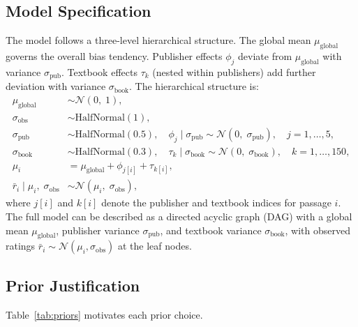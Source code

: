 \documentclass[10pt,letterpaper]{article}
\begin{document}
\subsection{Model Specification}

The model follows a three-level hierarchical structure.  The global mean
$\mu_{\text{global}}$ governs the overall bias tendency.  Publisher effects
$\phi_j$ deviate from $\mu_{\text{global}}$ with variance $\sigma_{\text{pub}}$.
Textbook effects $\tau_k$ (nested within publishers) add further deviation with
variance $\sigma_{\text{book}}$.  The hierarchical structure is:
\begin{align}
  \mu_{\text{global}} &\sim \mathcal{N}(0,\; 1),
  \label{eq:prior_muglobal}\\[4pt]
  \sigma_{\text{obs}} &\sim \text{HalfNormal}(1),
  \label{eq:prior_sigobs}\\[4pt]
  \sigma_{\text{pub}} &\sim \text{HalfNormal}(0.5),\quad
  \phi_j \mid \sigma_{\text{pub}} \sim \mathcal{N}(0,\; \sigma_{\text{pub}}),
  \quad j = 1,\ldots,5,
  \label{eq:prior_publisher}\\[4pt]
  \sigma_{\text{book}} &\sim \text{HalfNormal}(0.3),\quad
  \tau_k \mid \sigma_{\text{book}} \sim \mathcal{N}(0,\; \sigma_{\text{book}}),
  \quad k = 1,\ldots,150,
  \label{eq:prior_textbook}\\[4pt]
  \mu_i &= \mu_{\text{global}} + \phi_{j[i]} + \tau_{k[i]},
  \label{eq:linear_predictor}\\[4pt]
  \bar{r}_i \mid \mu_i,\; \sigma_{\text{obs}} &\sim \mathcal{N}(\mu_i,\;
    \sigma_{\text{obs}}),
  \label{eq:likelihood}
\end{align}
where $j[i]$ and $k[i]$ denote the publisher and textbook indices for passage
$i$.  The full model can be described as a directed acyclic graph (DAG) with
a global mean $\mu_{\text{global}}$, publisher variance $\sigma_{\text{pub}}$,
and textbook variance $\sigma_{\text{book}}$, with observed ratings
$\bar{r}_i \sim \mathcal{N}(\mu_i, \sigma_{\text{obs}})$ at the leaf nodes.

\subsection{Prior Justification}

Table~\ref{tab:priors} motivates each prior choice.
\end{document}
